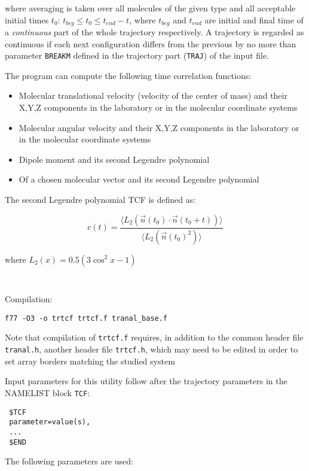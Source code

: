 \documentclass{article}
\begin{document}
\noindent
where averaging is taken over all molecules of the given type and all
acceptable initial times $t_0$:   $t_{beg} \le t_0 \le t_{end}-t$, where
$t_{beg}$ and $t_{end}$ are initial and final time of a {\it continuous}
part of the whole trajectory respectively. A trajectory is regarded as 
continuous if each next configuration differs from the previous by no more
than parameter \verb|BREAKM| defined in the trajectory part (\verb|TRAJ|)
of the input file.

The program can compute the following time correlation functions:

\begin{itemize}
\item
Molecular translational velocity (velocity of the center of mass) and
their X,Y,Z components in the laboratory or in the molecular coordinate systems
\item
Molecular angular velocity and
their X,Y,Z components in the laboratory or in the molecular coordinate systems
\item
Dipole moment and its second Legendre polynomial
\item
Of a chosen molecular vector and its second Legendre polynomial
\end{itemize}

The second Legendre polynomial TCF is defined as:

\begin{equation}
\label{TCF-L2}
c(t) = \frac{\langle L_2(\vec{n}(t_0)\cdot\vec{n}(t_0+t))\rangle}
{\langle L_2(\vec{n}(t_0)^2)\rangle}
\end{equation}

where $L_2(x) = 0.5(3\cos^2 x -1)$ 

\verb| |

Compilation:

\verb|f77 -O3 -o trtcf trtcf.f tranal_base.f|

Note that compilation of \verb|trtcf.f| requires, in addition to
the common header file \verb|tranal.h|, another header file \verb|trtcf.h|,
which may need to be edited in order to set array borders matching the 
studied system

Input parameters for this utility follow after the trajectory parameters
in the NAMELIST block \verb|TCF|:

\begin{verbatim}
 $TCF
 parameter=value(s),
 ...
 $END
\end{verbatim}

The following parameters are used:
\end{document}
